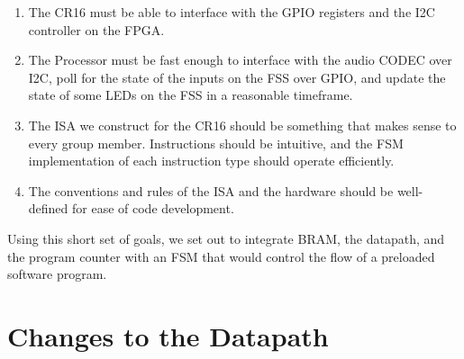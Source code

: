 \documentclass[conference]{IEEEtran}
\begin{document}
\begin{enumerate}
    \item The CR16 must be able to interface with the GPIO registers and the I2C controller on the FPGA.
    \item The Processor must be fast enough to interface with the audio CODEC over I2C, poll for the state of the inputs on the FSS over GPIO, and update the state of some LEDs on the FSS in a reasonable timeframe.
    \item The ISA we construct for the CR16 should be something that makes sense to every group member. Instructions should be intuitive, and the FSM implementation of each instruction type should operate efficiently.
    \item The conventions and rules of the ISA and the hardware should be well-defined for ease of code development.
\end{enumerate}

Using this short set of goals, we set out to integrate BRAM, the datapath, and the program counter with an FSM that would control the flow of a preloaded software program.

\section{Changes to the Datapath}
\end{document}
